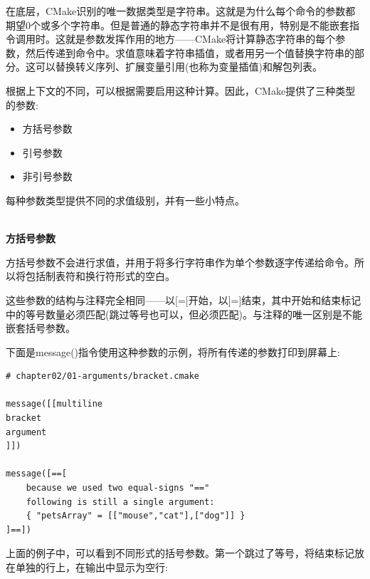 在底层，CMake识别的唯一数据类型是字符串。这就是为什么每个命令的参数都期望0个或多个字符串。但是普通的静态字符串并不是很有用，特别是不能嵌套指令调用时。这就是参数发挥作用的地方——CMake将计算静态字符串的每个参数，然后传递到命令中。求值意味着字符串插值，或者用另一个值替换字符串的部分。这可以替换转义序列、扩展变量引用(也称为变量插值)和解包列表。

根据上下文的不同，可以根据需要启用这种计算。因此，CMake提供了三种类型的参数:

\begin{itemize}
\item 
方括号参数

\item 
引号参数

\item 
非引号参数
\end{itemize}

每种参数类型提供不同的求值级别，并有一些小特点。

\hspace*{\fill} \\ %
\noindent
\textbf{方括号参数}

方括号参数不会进行求值，并用于将多行字符串作为单个参数逐字传递给命令。所以将包括制表符和换行符形式的空白。

这些参数的结构与注释完全相同——以[=[开始，以]=]结束，其中开始和结束标记中的等号数量必须匹配(跳过等号也可以，但必须匹配)。与注释的唯一区别是不能嵌套括号参数。

下面是message()指令使用这种参数的示例，将所有传递的参数打印到屏幕上:

\begin{lstlisting}[style=styleCMake]
# chapter02/01-arguments/bracket.cmake	

message([[multiline
bracket
argument
]])

message([==[
	because we used two equal-signs "=="
	following is still a single argument:
	{ "petsArray" = [["mouse","cat"],["dog"]] }
]==])
\end{lstlisting}

上面的例子中，可以看到不同形式的括号参数。第一个跳过了等号，将结束标记放在单独的行上，在输出中显示为空行:


